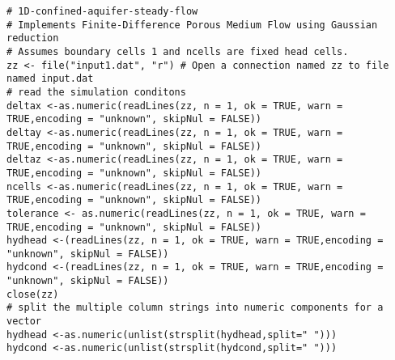 \clearpage 
 \begin{lstlisting}[caption= R code demonstrating an Aquifer Flow Simulator for Steady Flow  \\ 
 This version constructs coefficient matrix then solves the linear system. The program uses the same input
 file, label=lst:AquiferFlowSteady1DimensionalLinearSys]
# 1D-confined-aquifer-steady-flow
# Implements Finite-Difference Porous Medium Flow using Gaussian reduction
# Assumes boundary cells 1 and ncells are fixed head cells.
zz <- file("input1.dat", "r") # Open a connection named zz to file named input.dat
# read the simulation conditons
deltax <-as.numeric(readLines(zz, n = 1, ok = TRUE, warn = TRUE,encoding = "unknown", skipNul = FALSE))
deltay <-as.numeric(readLines(zz, n = 1, ok = TRUE, warn = TRUE,encoding = "unknown", skipNul = FALSE))
deltaz <-as.numeric(readLines(zz, n = 1, ok = TRUE, warn = TRUE,encoding = "unknown", skipNul = FALSE))
ncells <-as.numeric(readLines(zz, n = 1, ok = TRUE, warn = TRUE,encoding = "unknown", skipNul = FALSE))
tolerance <- as.numeric(readLines(zz, n = 1, ok = TRUE, warn = TRUE,encoding = "unknown", skipNul = FALSE))
hydhead <-(readLines(zz, n = 1, ok = TRUE, warn = TRUE,encoding = "unknown", skipNul = FALSE))
hydcond <-(readLines(zz, n = 1, ok = TRUE, warn = TRUE,encoding = "unknown", skipNul = FALSE))
close(zz)
# split the multiple column strings into numeric components for a vector
hydhead <-as.numeric(unlist(strsplit(hydhead,split=" ")))
hydcond <-as.numeric(unlist(strsplit(hydcond,split=" ")))


\end{lstlisting}
